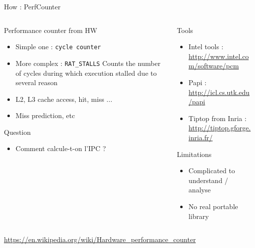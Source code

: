 %
\begin{Frame}{How : PerfCounter}
  \begin{columns}[t]
    \begin{column}{\BW} %
      \begin{block}{Performance counter from HW}
        \begin{itemize}
        \item Simple one : \texttt{cycle counter}
        \item More complex : \texttt{RAT\_STALLS} Counts the number of cycles during which execution stalled due to several reason
        \item L2, L3 cache access, hit, miss ...
        \item Miss prediction, etc
        \end{itemize}
      \end{block} 
      \begin{alertblock}{Question}
        \begin{itemize}
        \item Comment calcule-t-on l'IPC ?
        \end{itemize}
      \end{alertblock}
    \end{column}
    
    \begin{column}{\BW} %
      \begin{block}{Tools}
        \begin{itemize}
        \item Intel tools : \url{http://www.intel.com/software/pcm}
        \item Papi : \url{http://icl.cs.utk.edu/papi}
        \item Tiptop from Inria : \url{http://tiptop.gforge.inria.fr/}
        \end{itemize}
      \end{block}   
      \begin{alertblock}{Limitations}
        \begin{itemize}
        \item Complicated to understand / analyse
        \item No real portable library
        \end{itemize}
      \end{alertblock}   
    \end{column}
  \end{columns}  
\url{https://en.wikipedia.org/wiki/Hardware_performance_counter}
\end{Frame}


